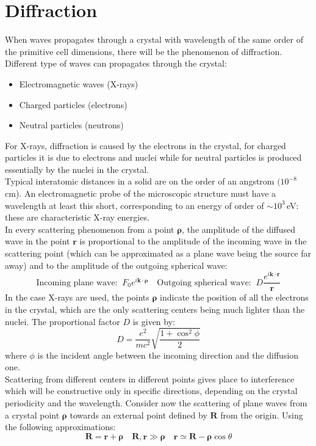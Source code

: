 \documentclass[10.75pt,a4paper,openright,bottom=2cm]{article}
\renewcommand{\Vec}[1]{\boldsymbol{#1}}
\begin{document}
\section{Diffraction}
When waves propagates through a crystal with wavelength of the same order of the primitive cell dimensions, there will be the phenomenon of diffraction. Different type of waves can propagates through the crystal:
\begin{itemize}
    \item Electromagnetic waves (X-rays)
    \item Charged particles (electrons)
    \item Neutral particles (neutrons)
\end{itemize}
For X-rays, diffraction is caused by the electrons in the crystal, for charged particles it is due to electrons and nuclei while for neutral particles is produced essentially by the nuclei in the crystal.\\
Typical interatomic distances in a solid are on the order of an angstrom $(10^{-8}$\,cm). An electromagnetic probe of the microscopic structure must have a wavelength at least this short, corresponding to an energy of order of $\sim10^3$\,eV: these are characteristic X-ray energies.\\
In every scattering phenomenon from a point $\Vec{\rho}$, the amplitude of the diffused wave in the point $\Vec{r}$ is proportional to the amplitude of the incoming wave in the scattering point (which can be approximated as a plane wave being the source far away) and to the amplitude of the outgoing spherical wave:
\[
\text{Incoming plane wave:}\;\; F_0e^{i\Vec{k}\cdot\Vec{\rho}} \quad \text{Outgoing spherical wave:}\;\; D\frac{e^{i\Vec{k}\cdot\Vec{r}}}{\Vec{r}}
\]
In the case X-rays are used, the points $\Vec{\rho}$ indicate the position of all the electrons in the crystal, which are the only scattering centers being much lighter than the nuclei. The proportional factor $D$ is given by:
\[
D=\frac{e^2}{mc^2}\sqrt{\frac{1+\cos^2\phi}{2}}
\]
where $\phi$ is the incident angle between the incoming direction and the diffusion one.\\
Scattering from different centers in different points gives place to interference which will be constructive only in specific directions, depending on the crystal periodicity and the wavelength. Consider now the scattering of plane waves from a crystal point $\Vec{\rho}$ towards an external point defined by $\Vec{R}$ from the origin. Using the following approximations:
\[
\Vec{R}=\Vec{r}+\Vec{\rho} \quad \Vec{R},\Vec{r}\gg\Vec{\rho} \quad \Vec{r}\simeq\Vec{R}-\Vec{\rho}\cos\theta
\]
\end{document}
